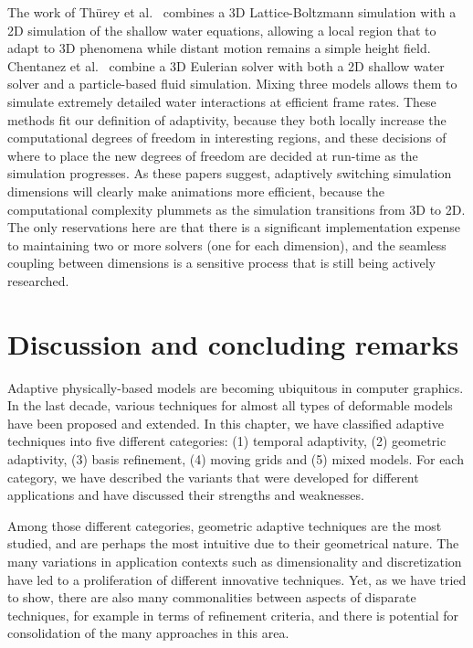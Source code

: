 The work of Th\"urey et al.~\cite{Thurey2006:Coupling} combines a 3D Lattice-Boltzmann simulation with a 2D simulation of the shallow water equations, allowing a local region that to adapt to 3D phenomena while distant motion remains a simple height field. Chentanez et al.~\cite{Chentanez2014} combine a 3D Eulerian solver with both a 2D shallow water solver and a particle-based fluid simulation. Mixing three models allows them to simulate extremely detailed water interactions at efficient frame rates. These methods fit our definition of adaptivity, because they both locally increase the computational degrees of freedom in interesting regions, and these decisions of where to place the new degrees of freedom are decided at run-time as the simulation progresses. As these papers suggest, adaptively switching simulation dimensions will clearly make animations more efficient, because the computational complexity plummets as the simulation transitions from 3D to 2D. The only reservations here are that there is a significant implementation expense to maintaining two or more solvers (one for each dimension), and the seamless coupling between dimensions is a sensitive process that is still being actively researched.

\section{Discussion and concluding remarks} \label{sec conclusion}
Adaptive physically-based models are becoming ubiquitous in computer graphics.
In the last decade, various techniques for almost all types of deformable models have been proposed and extended.
In this chapter, we have classified adaptive techniques into five different categories: (1) temporal adaptivity, (2) geometric adaptivity, (3) basis refinement, (4) moving grids and (5) mixed models.
For each category, we have described the variants that were developed for different applications and have discussed their strengths and weaknesses.

Among those different categories, geometric adaptive techniques are the most studied, and are perhaps the most intuitive due to their geometrical nature.
The many variations in application contexts such as dimensionality and discretization have led to a proliferation of different innovative techniques.
Yet, as we have tried to show, there are also many commonalities between aspects of disparate techniques, for example in terms of refinement criteria, and there is potential for consolidation of the many approaches in this area.

